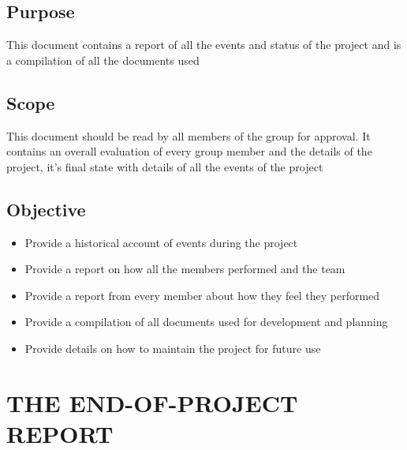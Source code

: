 \documentclass[12pt]{article}
\begin{document}
\subsection{Purpose}
This document contains a report of all the events and status of the project and is a compilation of all the documents used
\subsection{Scope}
This document should be read by all members of the group for approval. It contains an overall evaluation of every group member and the details of the project, it's final state with details of all the events of the project
\subsection{Objective}
\begin{itemize}
\item Provide a historical account of events during the project
\item Provide a report on how all the members performed and the team
\item Provide a report from every member about how they feel they performed
\item Provide a compilation of all documents used for development and planning
\item Provide details on how to maintain the project for future use
\end{itemize}
\newpage
\section{THE END-OF-PROJECT REPORT}
\end{document}
